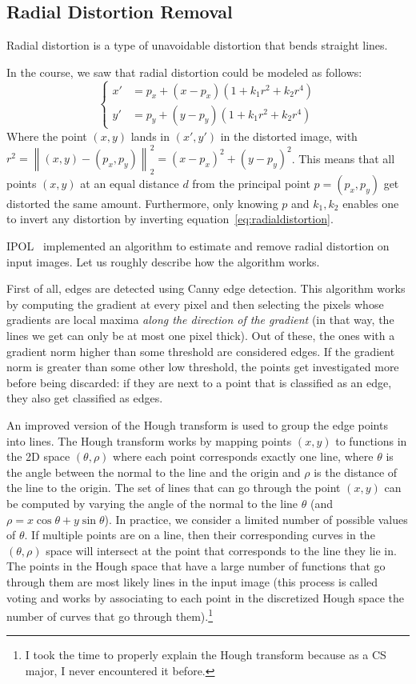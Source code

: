 \subsection{Radial Distortion Removal}\label{subsec:radialdistortion}

Radial distortion is a type of unavoidable distortion that bends straight lines.

In the course, we saw that radial distortion could be modeled as follows:
\begin{equation}\label{eq:radialdistortion}
\begin{cases}
    x'&=p_x+(x-p_x)(1+k_1 r^2+k_2 r^4)\\
    y'&=p_y+(y-p_y)(1+k_1 r^2+k_2 r^4)
\end{cases}
\end{equation}
Where the point $(x,y)$ lands in $(x',y')$ in the distorted image, with
$r^2=\left\| (x,y)-(p_x,p_y) \right\|_2^2=(x-p_x)^2+(y-p_y)^2$.
This means that all points $(x,y)$ at an equal distance $d$ from the principal point $p=(p_x,p_y)$ get distorted the
same amount.
Furthermore, only knowing $p$ and $k_1,k_2$ enables one to invert any distortion by inverting
equation~\eqref{eq:radialdistortion}.

IPOL~\citep{lensdistortioncorrection} implemented an algorithm to estimate and remove radial distortion on input images.
Let us roughly describe how the algorithm works.

First of all, edges are detected using Canny edge detection.
This algorithm works by computing the gradient at every pixel and then selecting the pixels whose gradients are local
maxima \textit{along the direction of the gradient} (in that way, the lines we get can only be at most one pixel thick).
Out of these, the ones with a gradient norm higher than some threshold are considered edges.
If the gradient norm is greater than some other low threshold, the points get investigated more before being discarded:
if they are next to a point that is classified as an edge, they also get classified as edges.

An improved version of the Hough transform is used to group the edge points into lines.
The Hough transform works by mapping points $(x,y)$ to functions in the 2D space $(\theta,\rho)$ where each point
corresponds exactly one line, where $\theta$ is the angle between the normal to the line and the origin and $\rho$ is
the distance of the line to the origin.
The set of lines that can go through the point $(x,y)$ can be computed by varying the angle of the normal to the line
$\theta$ (and $\rho=x\cos\theta + y\sin\theta$).
In practice, we consider a limited number of possible values of $\theta$.
If multiple points are on a line, then their corresponding curves in the $(\theta,\rho)$ space will intersect at the
point that corresponds to the line they lie in.
The points in the Hough space that have a large number of functions that go through them are most likely lines in the
input image (this process is called voting and works by associating to each point in the discretized Hough space the
number of curves that go through them).\footnote{I took the time to properly explain the Hough transform because as a
CS major, I never encountered it before.}

